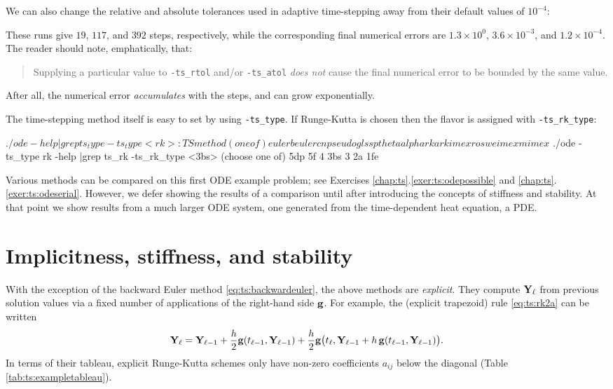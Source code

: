 We can also change the relative and absolute tolerances used in adaptive time-stepping away from their default values of $10^{-4}$:
These runs give $19$, $117$, and $392$ steps, respectively, while the corresponding final numerical errors are $1.3 ^0$, $3.6^{-3}$, and $1.2^{-4}$.  The reader should note, emphatically, that:
\begin{quote}
Supplying a particular value to \texttt{-ts\_rtol} and/or \texttt{-ts\_atol} \emph{does not} cause the final numerical error to be bounded by the same value.
\end{quote}
After all, the numerical error \emph{accumulates} with the steps, and can grow exponentially.
  
The time-stepping method itself is easy to set by using \texttt{-ts\_type}.  If Runge-Kutta is chosen then the flavor is assigned with \texttt{-ts\_rk\_type}:
\begin{cline}
$ ./ode -help |grep ts_type
  -ts_type <rk>: TS method (one of) euler beuler cn pseudo gl ssp theta alpha rk
                 arkimex rosw eimex mimex
$ ./ode -ts_type rk -help |grep ts_rk
  -ts_rk_type <3bs> (choose one of) 5dp 5f 4 3bs 3 2a 1fe
\end{cline}

Various \pTS methods can be compared on this first ODE example problem; see Exercises \ref{chap:ts}.\ref{exer:ts:odepossible} and \ref{chap:ts}.\ref{exer:ts:odeserial}.  However, we defer showing the results of a comparison until after introducing the concepts of stiffness and stability.  At that point we show results from a much larger ODE system, one generated from the time-dependent heat equation, a PDE.


\section{Implicitness, stiffness, and stability}

With the exception of the backward Euler method \eqref{eq:ts:backwardeuler}, the above methods are \emph{explicit}.  They compute $\mathbf{Y}_\ell$ from previous solution values via a fixed number of applications of the right-hand side $\mathbf{g}$.  For example, the \RKtwoa (explicit trapezoid) rule \eqref{eq:ts:rk2a} can be written
\begin{equation}
\mathbf{Y}_\ell = \mathbf{Y}_{\ell-1} + \frac{h}{2} \mathbf{g}(t_{\ell-1},\mathbf{Y}_{\ell-1}) + \frac{h}{2} \mathbf{g}\big(t_\ell,\mathbf{Y}_{\ell-1} + h\, \mathbf{g}(t_{\ell-1},\mathbf{Y}_{\ell-1})\big). \label{eq:ts:rk2aexplicit}
\end{equation}
In terms of their tableau, explicit Runge-Kutta schemes only have non-zero coefficients $a_{ij}$ below the diagonal (Table \ref{tab:ts:exampletableau}).

